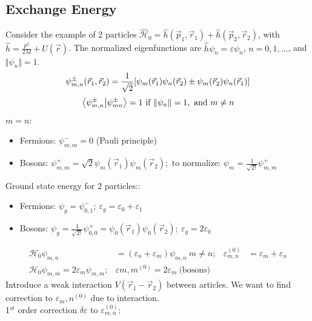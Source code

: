 \documentclass[10pt]{article}
\newcommand{\Ham}{\hat{\mathcal{H}}}
\begin{document}
\subsection{Exchange Energy}
Consider the example of 2 particles $\Ham_0 = \hat h(\vec p_1, \vec r_1) + \hat h(\vec p_2, \vec r_2)$, with $\hat h = \frac{p^2}{2M} + U(\vec r)$. The normalized eigenfunctions are $\hat h \psi_n = \varepsilon \psi_n$, $n = 0,1,\hdots$, and $\Vert \psi_n \Vert = 1$. 
$$
\psi_{m,n}^\pm (\vec r_1, \vec r_2) = \frac{1}{\sqrt{2}}\qty[\psi_m(\vec r_1)\psi_n(\vec r_2)\pm \psi_m(\vec r_2)\psi_n(\vec r_1)]
$$
$$
\braket{\psi^\pm_{m,n}}{\psi^\pm_{mn}} = 1 \ \text{if} \ \Vert \psi_n \Vert = 1, \ \text{and} \ m \neq n
$$
$m = n$:
\begin{itemize}
    \item[]Fermions: $\psi_{m,m}^- = 0$ (Pauli principle) 
    \item[]Bosons: $\psi_{m,m}^+ = \sqrt{2}\psi_m(\vec r_1)\psi_m(\vec r_2);$ to normalize: $\psi_m = \frac{1}{\sqrt{2!}}\psi^+_{m,m}$
\end{itemize}
Ground state energy for 2 particles::
\begin{itemize}
    \item[]Fermions: $\psi_g = \psi^-_{0,1}; \ \varepsilon_g = \varepsilon_0 + \varepsilon_1$
    \item[]Bosons: $\psi_g = \frac{1}{\sqrt{2!}}\psi_{0,0}^+ = \psi_0(\vec r_1)\psi_0(\vec r_2); \ \varepsilon_g = 2\varepsilon_0$
\end{itemize}
\begin{align*}
    \mathcal H_0 \psi_{m,n} &= (\varepsilon_n + \varepsilon_m)\psi_{m,n} \ m\neq n; & \varepsilon_{m,n}^{(0)} &= \varepsilon_{m} + \varepsilon_{n} \\
    \mathcal H_0 \psi_{m,m} = 2\varepsilon_m\psi_{m,m}; & \varepsilon{m,m}^{(0)} = 2\varepsilon_m \ \text{(bosons)}
\end{align*}
Introduce a weak interaction $V(\vec r_1 - \vec r_2)$ between articles. We want to find correction to $\varepsilon_m,n^{(0)}$ due to interaction.\\
1${}^{st}$ order correction $\delta \varepsilon$ to $\varepsilon_{m,n}^{(0)}$:
\end{document}
